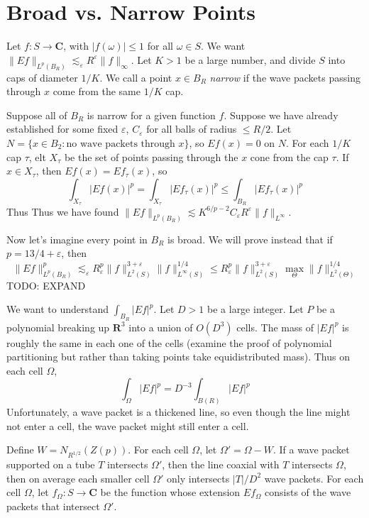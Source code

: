\section{Broad vs. Narrow Points}

Let $f: S \to \mathbf{C}$, with $|f(\omega)| \leq 1$ for all $\omega \in S$. We want $\| Ef \|_{L^p(B_R)} \lesssim_\varepsilon R^\varepsilon \| f \|_{\infty}$. Let $K > 1$ be a large number, and divide $S$ into caps of diameter $1/K$. We call a point $x \in B_R$ {\it narrow} if the wave packets passing through $x$ come from the same $1/K$ cap.

Suppose all of $B_R$ is narrow for a given function $f$. Suppose we have already established for some fixed $\varepsilon$, $C_\varepsilon$ for all balls of radius $\leq R/2$. Let $N = \{ x \in B_2: \text{no wave packets through $x$} \}$, so $Ef(x) = 0$ on $N$. For each $1/K$ cap $\tau$, elt $X_\tau$ be the set of points passing through the $x$ cone from the cap $\tau$. If $x \in X_\tau$, then $Ef(x) = Ef_\tau(x)$, so
%
\[ \int_{X_\tau} |Ef(x)|^p = \int_{X_\tau} |Ef_\tau(x)|^p \leq \int_{B_R} |Ef_\tau(x)|^p \]
%
Thus
%
%
Thus we have found $\| E f\|_{L^p(B_R)} \lesssim K^{6/p - 2} C_\varepsilon R^\varepsilon \| f \|_{L^\infty}$.

Now let's imagine every point in $B_R$ is broad. We will prove instead that if $p = 13/4 + \varepsilon$, then
%
\[ \| Ef \|_{L^p(B_R)}^p \lesssim_\varepsilon R_\varepsilon^p \| f \|_{L^2(S)}^{3 + \varepsilon} \| f \|_{L^\infty(S)}^{1/4} \leq R_\varepsilon^p \| f \|_{L^2(S)}^{3 + \varepsilon} \max_\Theta \| f \|_{L^2(\Theta)}^{1/4} \]
%
TODO: EXPAND

We want to understand $\int_{B_R} |Ef|^p$. Let $D > 1$ be a large integer. Let $P$ be a polynomial breaking up $\mathbf{R}^3$ into a union of $O(D^3)$ cells. The mass of $|Ef|^p$ is roughly the same in each one of the cells (examine the proof of polynomial partitioning but rather than taking points take equidistributed mass). Thus on each cell $\Omega$,
%
\[ \int_\Omega |Ef|^p = D^{-3} \int_{B(R)} |Ef|^p \]
%
Unfortunately, a wave packet is a thickened line, so even though the line might not enter a cell, the wave packet might still enter a cell.

Define $W = N_{R^{1/2}}(Z(p))$. For each cell $\Omega$, let $\Omega' = \Omega - W$. If a wave packet supported on a tube $T$ intersects $\Omega'$, then the line coaxial with $T$ intersects $\Omega$, then on average each smaller cell $\Omega'$ only intersects $|T|/D^2$ wave packets. For each cell $\Omega$, let $f_\Omega: S \to \mathbf{C}$ be the function whose extension $Ef_\Omega$ consists of the wave packets that intersect $\Omega'$.

\begin{thebibliography}{9}

\end{thebibliography}

